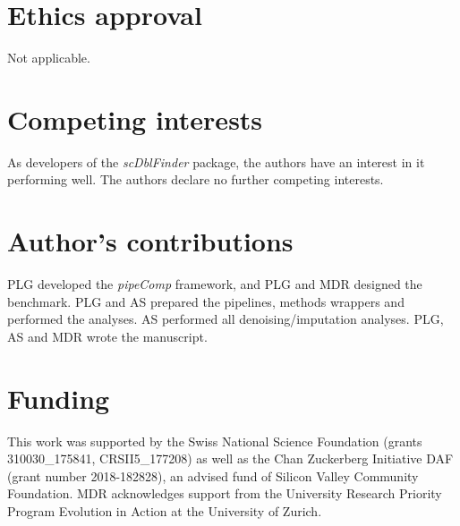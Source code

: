 \documentclass{bmcart}
\begin{document}
\begin{backmatter}

\section*{Ethics approval}
Not applicable.

\section*{Competing interests}
As developers of the \textit{scDblFinder} package, the authors have an interest in it performing well. The authors declare no further competing interests.

\section*{Author's contributions}
PLG developed the \textit{pipeComp} framework, and PLG and MDR designed the benchmark. PLG and AS prepared the pipelines, methods wrappers and performed the analyses. AS performed all denoising/imputation analyses. PLG, AS and MDR wrote the manuscript.

\section*{Funding}

This work was supported by the Swiss National Science Foundation (grants 310030\_175841, CRSII5\_177208) as well as the Chan Zuckerberg Initiative DAF (grant number 2018-182828), an advised fund of Silicon Valley Community Foundation. MDR acknowledges support from the University Research Priority Program Evolution in Action at the University of Zurich.



\end{backmatter}
\end{document}
